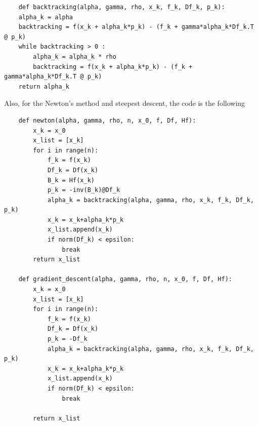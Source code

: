 \begin{verbatim}
    def backtracking(alpha, gamma, rho, x_k, f_k, Df_k, p_k):
    alpha_k = alpha
    backtracking = f(x_k + alpha_k*p_k) - (f_k + gamma*alpha_k*Df_k.T @ p_k)
    while backtracking > 0 :
        alpha_k = alpha_k * rho
        backtracking = f(x_k + alpha_k*p_k) - (f_k + gamma*alpha_k*Df_k.T @ p_k)
    return alpha_k
\end{verbatim}

Also, for the Newton's method and steepest descent, the code is the following

\begin{verbatim}
    def newton(alpha, gamma, rho, n, x_0, f, Df, Hf):
        x_k = x_0
        x_list = [x_k]
        for i in range(n):
            f_k = f(x_k)
            Df_k = Df(x_k)
            B_k = Hf(x_k)
            p_k = -inv(B_k)@Df_k
            alpha_k = backtracking(alpha, gamma, rho, x_k, f_k, Df_k, p_k)
            x_k = x_k+alpha_k*p_k
            x_list.append(x_k)
            if norm(Df_k) < epsilon:
                break
        return x_list

    def gradient_descent(alpha, gamma, rho, n, x_0, f, Df, Hf):
        x_k = x_0
        x_list = [x_k]
        for i in range(n):
            f_k = f(x_k)
            Df_k = Df(x_k)
            p_k = -Df_k
            alpha_k = backtracking(alpha, gamma, rho, x_k, f_k, Df_k, p_k)
            x_k = x_k+alpha_k*p_k
            x_list.append(x_k)
            if norm(Df_k) < epsilon:
                break
        
        return x_list
\end{verbatim}

